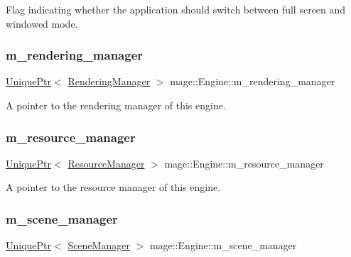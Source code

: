 Flag indicating whether the application should switch between full screen and windowed mode. \hypertarget{classmage_1_1_engine_a81c7475c3501f84f9bd9c7bbeaebfcb6}{}\label{classmage_1_1_engine_a81c7475c3501f84f9bd9c7bbeaebfcb6} 
\subsubsection{\texorpdfstring{m\+\_\+rendering\+\_\+manager}{m\_rendering\_manager}}
{\footnotesize\ttfamily \hyperlink{namespacemage_a3316d7143a973e37adf1110f2e80ca31}{Unique\+Ptr}$<$ \hyperlink{classmage_1_1_rendering_manager}{Rendering\+Manager} $>$ mage\+::\+Engine\+::m\+\_\+rendering\+\_\+manager\hspace{0.3cm}{\ttfamily [private]}}

A pointer to the rendering manager of this engine. \hypertarget{classmage_1_1_engine_ac8d94579e72983a99a78be6b9b606a28}{}\label{classmage_1_1_engine_ac8d94579e72983a99a78be6b9b606a28} 
\subsubsection{\texorpdfstring{m\+\_\+resource\+\_\+manager}{m\_resource\_manager}}
{\footnotesize\ttfamily \hyperlink{namespacemage_a3316d7143a973e37adf1110f2e80ca31}{Unique\+Ptr}$<$ \hyperlink{classmage_1_1_resource_manager}{Resource\+Manager} $>$ mage\+::\+Engine\+::m\+\_\+resource\+\_\+manager\hspace{0.3cm}{\ttfamily [private]}}

A pointer to the resource manager of this engine. \hypertarget{classmage_1_1_engine_afac8085ae572d623e77b1e0847440ab4}{}\label{classmage_1_1_engine_afac8085ae572d623e77b1e0847440ab4} 
\subsubsection{\texorpdfstring{m\+\_\+scene\+\_\+manager}{m\_scene\_manager}}
{\footnotesize\ttfamily \hyperlink{namespacemage_a3316d7143a973e37adf1110f2e80ca31}{Unique\+Ptr}$<$ \hyperlink{classmage_1_1_scene_manager}{Scene\+Manager} $>$ mage\+::\+Engine\+::m\+\_\+scene\+\_\+manager\hspace{0.3cm}{\ttfamily [private]}}


